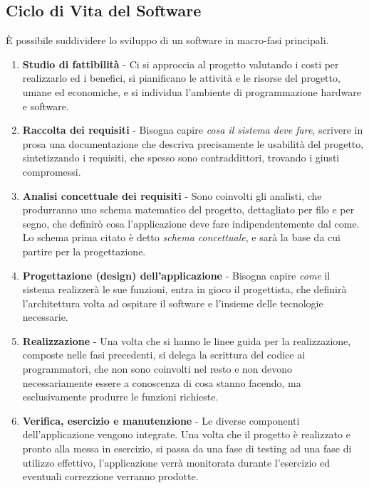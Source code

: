 \documentclass[12pt, letterpaper]{article}
\begin{document}
\subsection{Ciclo di Vita del Software}
È possibile suddividere lo sviluppo di un software in macro-fasi principali.\begin{enumerate}
    \item \textbf{Studio di fattibilità} - Ci si approccia al progetto valutando i costi per realizzarlo ed
          i benefici, si pianificano le attività e le risorse del progetto, umane ed economiche, e si individua l'ambiente
          di programmazione hardware e software.
    \item \textbf{Raccolta dei requisiti} - Bisogna capire \textit{cosa il sistema deve fare}, scrivere in prosa
          una documentazione che descriva precisamente le usabilità del progetto, sintetizzando i requisiti, che spesso
          sono contraddittori, trovando i giusti compromessi.
    \item \textbf{Analisi concettuale dei requisiti} - Sono coinvolti gli analisti, che produrranno uno schema
          matematico del progetto, dettagliato per filo e per segno, che definirò cosa l'applicazione deve fare
          indipendentemente dal come. Lo schema prima citato è detto \textit{schema concettuale}, e sarà la base
          da cui partire per la progettazione.
    \item \textbf{Progettazione (design) dell'applicazione} -  Bisogna capire \textit{come} il sistema
          realizzerà le sue funzioni, entra in gioco il progettista, che definirà l'architettura volta ad ospitare
          il software e l'insieme delle tecnologie necessarie.
    \item \textbf{Realizzazione} - Una volta che si hanno le linee guida per la realizzazione, composte
          nelle fasi precedenti, si delega la scrittura del codice ai programmatori, che non sono coinvolti nel resto
          e non devono necessariamente essere a conoscenza di cosa stanno facendo, ma esclusivamente produrre
          le funzioni richieste.
    \item \textbf{Verifica, esercizio e manutenzione} - Le diverse componenti dell'applicazione vengono
          integrate. Una volta che il progetto è realizzato e pronto alla
          messa in esercizio, si passa da una fase di testing ad una fase di utilizzo effettivo, l'applicazione verrà
          monitorata durante l'esercizio ed eventuali correzzione verranno prodotte.
\end{enumerate}
\end{document}
